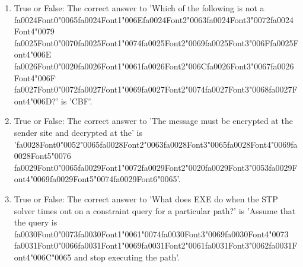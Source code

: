 \documentclass[12pt]{article}
\begin{document}
\begin{enumerate}[label=\arabic*.]
\item True or False: The correct answer to 'Which of the following is not a {\csname fa0024Font0\endcsname\char"0065}{\csname fa0024Font1\endcsname\char"006E}{\csname fa0024Font2\endcsname\char"0063}{\csname fa0024Font3\endcsname\char"0072}{\csname fa0024Font4\endcsname\char"0079} {\csname fa0025Font0\endcsname\char"0070}{\csname fa0025Font1\endcsname\char"0074}{\csname fa0025Font2\endcsname\char"0069}{\csname fa0025Font3\endcsname\char"006F}{\csname fa0025Font4\endcsname\char"006E} {\csname fa0026Font0\endcsname\char"0020}{\csname fa0026Font1\endcsname\char"0061}{\csname fa0026Font2\endcsname\char"006C}{\csname fa0026Font3\endcsname\char"0067}{\csname fa0026Font4\endcsname\char"006F} {\csname fa0027Font0\endcsname\char"0072}{\csname fa0027Font1\endcsname\char"0069}{\csname fa0027Font2\endcsname\char"0074}{\csname fa0027Font3\endcsname\char"0068}{\csname fa0027Font4\endcsname\char"006D}?' is 'CBF'.
\item True or False: The correct answer to 'The message must be encrypted at the sender site and decrypted at the' is '{\csname fa0028Font0\endcsname\char"0052}{\char"0065}{\csname fa0028Font2\endcsname\char"0063}{\csname fa0028Font3\endcsname\char"0065}{\csname fa0028Font4\endcsname\char"0069}{\csname fa0028Font5\endcsname\char"0076} {\csname fa0029Font0\endcsname\char"0065}{\csname fa0029Font1\endcsname\char"0072}{\csname fa0029Font2\endcsname\char"0020}{\csname fa0029Font3\endcsname\char"0053}{\csname fa0029Font4\endcsname\char"0069}{\csname fa0029Font5\endcsname\char"0074}{\csname fa0029Font6\endcsname\char"0065}'.
\item True or False: The correct answer to 'What does EXE do when the STP solver times out on a constraint query for a particular path?' is 'Assume that the query is {\csname fa0030Font0\endcsname\char"0073}{\csname fa0030Font1\endcsname\char"0061}{\char"0074}{\csname fa0030Font3\endcsname\char"0069}{\csname fa0030Font4\endcsname\char"0073} {\csname fa0031Font0\endcsname\char"0066}{\csname fa0031Font1\endcsname\char"0069}{\csname fa0031Font2\endcsname\char"0061}{\csname fa0031Font3\endcsname\char"0062}{\csname fa0031Font4\endcsname\char"006C}{\char"0065} and stop executing the path'.
\end{enumerate}
\end{document}
